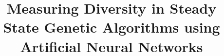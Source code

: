 \documentclass[a4paper]{IEEEconf}
\begin{document}
\title{Measuring Diversity in Steady State Genetic Algorithms using Artificial Neural Networks}


\maketitle

\listoftodos












\clearpage
\appendix

\end{document}
